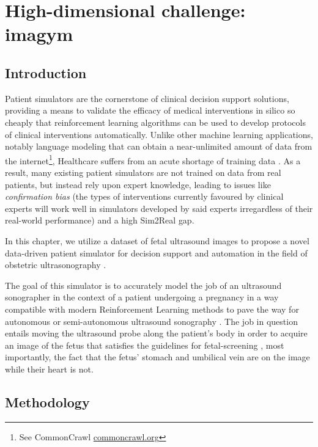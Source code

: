 \chapter{High-dimensional challenge: imagym}
\label{ch:imagym}

\section{Introduction}

Patient simulators are the cornerstone of clinical decision support solutions, providing a means to validate the efficacy of medical interventions in silico so cheaply that reinforcement learning algorithms can be used to develop protocols of clinical interventions automatically.
Unlike other machine learning applications, notably language modeling that can obtain a near-unlimited amount of data from the internet\footnote{See CommonCrawl \cite{commoncrawl} \url{commoncrawl.org}}, Healthcare suffers from an acute shortage of training data \cite{datashortage}.
As a result, many existing patient simulators are not trained on data from real patients, but instead rely upon expert knowledge, leading to issues like \emph{confirmation bias} (the types of interventions currently favoured by clinical experts will work well in simulators developed by said experts irregardless of their real-world performance) and a high Sim2Real \cite{sim2real} gap.

In this chapter, we utilize a dataset of fetal ultrasound images to propose a novel data-driven patient simulator for decision support and automation in the field of obstetric ultrasonography \cite{obstetrics-sonography}.

The goal of this simulator is to accurately model the job of an ultrasound sonographer in the context of a patient undergoing a pregnancy in a way compatible with modern Reinforcement Learning methods \cite{liDeepReinforcementLearning2017}
to pave the way for autonomous or semi-autonomous ultrasound sonography \cite{autonomous-ultrasound-review}.
The job in question entails moving the ultrasound probe along the patient's body in order to acquire an image of the fetus that satisfies the guidelines for fetal-screening \cite{isoug-guidelines}, most importantly, the fact that the fetus' stomach and umbilical vein are on the image while their heart is not.

\newpage
\section{Methodology}


